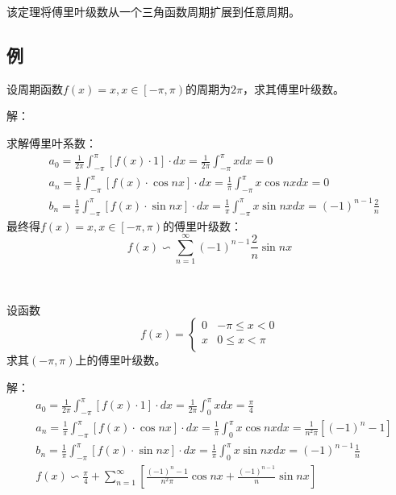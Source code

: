 该定理将傅里叶级数从一个三角函数周期扩展到任意周期。

\subsection{例}

\begin{example}
设周期函数$f\left( x \right) =x,x\in \left[ -\pi ,\pi \right) $的周期为$2\pi $，求其傅里叶级数。
\end{example}

解：

求解傅里叶系数：
\begin{align*}
&a_0=\frac{1}{2\pi}\int_{-\pi}^{\pi}{\left[ f\left( x \right) \cdot 1 \right] \cdot dx}=\frac{1}{2\pi}\int_{-\pi}^{\pi}{xdx}=0 \\
&a_n=\frac{1}{\pi}\int_{-\pi}^{\pi}{\left[ f\left( x \right) \cdot \cos nx \right] \cdot dx}=\frac{1}{\pi}\int_{-\pi}^{\pi}{x\cos nxdx}=0 \\
&b_n=\frac{1}{\pi}\int_{-\pi}^{\pi}{\left[ f\left( x \right) \cdot \sin nx \right] \cdot dx}=\frac{1}{\pi}\int_{-\pi}^{\pi}{x\sin nxdx}=\left( -1 \right) ^{n-1}\frac{2}{n}
\end{align*}
最终得$f\left( x \right) =x,x\in \left[ -\pi ,\pi \right) $的傅里叶级数：
\[
f\left( x \right) \backsim \sum_{n=1}^{\infty}{\left( -1 \right) ^{n-1}\frac{2}{n}\sin nx}
\]

~

\begin{example}
设函数
\[
f\left( x \right) =\begin{cases}
	0 & -\pi \leqslant x<0\\
	x & 0\leqslant x<\pi\\
\end{cases}
\]
求其$\left( -\pi ,\pi \right) $上的傅里叶级数。
\end{example}

解：
\begin{align*}
&a_0=\frac{1}{2\pi}\int_{-\pi}^{\pi}{\left[ f\left( x \right) \cdot 1 \right] \cdot dx}=\frac{1}{2\pi}\int_0^{\pi}{xdx}=\frac{\pi}{4} \\
&a_n=\frac{1}{\pi}\int_{-\pi}^{\pi}{\left[ f\left( x \right) \cdot \cos nx \right] \cdot dx}=\frac{1}{\pi}\int_0^{\pi}{x\cos nxdx}=\frac{1}{n^2\pi}\left[ \left( -1 \right) ^n-1 \right] \\
&b_n=\frac{1}{\pi}\int_{-\pi}^{\pi}{\left[ f\left( x \right) \cdot \sin nx \right] \cdot dx}=\frac{1}{\pi}\int_0^{\pi}{x\sin nxdx}=\left( -1 \right) ^{n-1}\frac{1}{n} \\
&f\left( x \right) \backsim \frac{\pi}{4}+\sum_{n=1}^{\infty}{\left[ \frac{\left( -1 \right) ^n-1}{n^2\pi}\cos nx+\frac{\left( -1 \right) ^{n-1}}{n}\sin nx \right]}
\end{align*}

